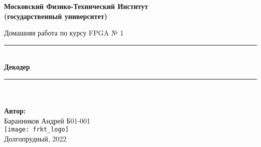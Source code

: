 \newcommand{\HRule}{\rule{\linewidth}{0.7mm}} %
	
	\begin{center}
		\large\textbf{Московский Физико-Технический Институт}\\
		\large\textbf{(государственный университет)}
	
		\vfill
		
		\Large Домашняя работа по курсу FPGA № 1\\[0.5cm] %
		
		
		\HRule
		\\[0.4cm]
		{ \huge \bfseries Декодер}
		\\[0.4cm] %
		\HRule
		\\[0.5cm]
		
		\ \\
	\textbf{\large Автор:} \\	
	\large Баранников Андрей Б01-001\\
		\vfill
		\hspace*{-0.8 cm}\texttt{[image: frkt\_logo]}\\
		\large Долгопрудный, 2022
	\end{center}

\newpage
\setcounter{page}{2}
\fancyfoot[c]{\thepage}
\fancyhead[R]{}
